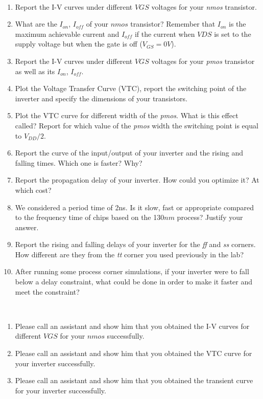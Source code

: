 	\begin{exercisesum}\	
			\vspace{-2mm}
	\begin{enumerate}
		\item Report the I-V curves under different $VGS$ voltages for your \textit {nmos} transistor.
		\item What are the $I_{on}$, $I_{off}$ of your $nmos$ transistor? Remember that $I_{on}$ is the maximum achievable current and $I_{off}$ if the current when $VDS$ is set to the supply voltage but when the gate is off ($V_{GS}=0V$).
		\item Report the I-V curves under different $VGS$ voltages for your \textit {pmos} transistor as well as its $I_{on}$, $I_{off}$.
		\item Plot the Voltage Transfer Curve (VTC), report the switching point of the inverter and specify the dimensions of your transistors.
		\item Plot the VTC curve for different width of the \textit{pmos}. What is this effect called? Report for which value of the \textit{pmos} width the switching point is equal to $V_{DD}/2$.
		\item Report the curve of the input/output of your inverter and the rising and falling times. Which one is faster? Why?
	\item Report the propagation delay of your inverter. How could you optimize it? At which cost?
	\item We considered a period time of 2ns. Is it slow, fast or appropriate compared to the frequency time of chips based on the 130$nm$ process? Justify your answer.			
			\item Report the rising and falling delays of your inverter for the \textit{ff} and \textit{ss} corners. How different are they from the \textit{tt} corner you used previously in the lab?
	\item After running some process corner simulations, if your inverter were to fall below a delay constraint, what could be done in order to make it faster and meet the constraint?
	\end{enumerate}
\vspace{-5mm}
\end{exercisesum}	

\begin{checkpointsum}\
	\vspace{-2mm}
	\begin{enumerate}
		\item Please call an assistant and show him that you obtained the I-V curves for different $VGS$ for your $nmos$ successfully.
		\item Please call an assistant and show him that you obtained the VTC curve for your inverter successfully.
		\item Please call an assistant and show him that you obtained the transient curve for your inverter successfully.
	\end{enumerate}
	\vspace{-5mm}
\end{checkpointsum}